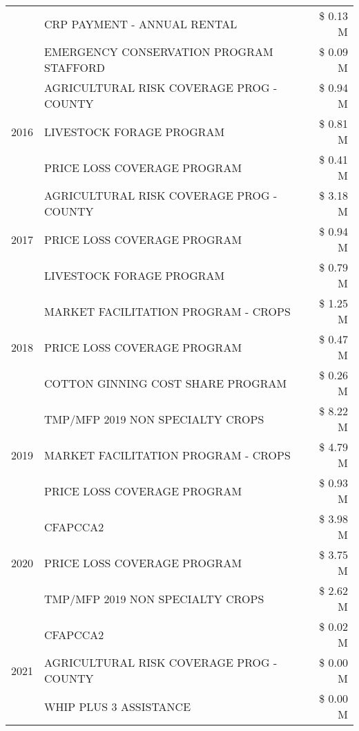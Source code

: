 \begin{tabular}{llr}
 & CRP PAYMENT - ANNUAL RENTAL & \$ 0.13 M \\
 & EMERGENCY CONSERVATION PROGRAM STAFFORD & \$ 0.09 M \\
\cline{1-3}
\multirow[t]{3}{*}{2016} & AGRICULTURAL RISK COVERAGE PROG - COUNTY      & \$ 0.94 M \\
 & LIVESTOCK FORAGE PROGRAM                      & \$ 0.81 M \\
 & PRICE LOSS COVERAGE PROGRAM                   & \$ 0.41 M \\
\cline{1-3}
\multirow[t]{3}{*}{2017} & AGRICULTURAL RISK COVERAGE PROG - COUNTY & \$ 3.18 M \\
 & PRICE LOSS COVERAGE PROGRAM & \$ 0.94 M \\
 & LIVESTOCK FORAGE PROGRAM & \$ 0.79 M \\
\cline{1-3}
\multirow[t]{3}{*}{2018} & MARKET FACILITATION PROGRAM - CROPS & \$ 1.25 M \\
 & PRICE LOSS COVERAGE PROGRAM & \$ 0.47 M \\
 & COTTON GINNING COST SHARE PROGRAM & \$ 0.26 M \\
\cline{1-3}
\multirow[t]{3}{*}{2019} & TMP/MFP 2019 NON SPECIALTY CROPS & \$ 8.22 M \\
 & MARKET FACILITATION PROGRAM - CROPS & \$ 4.79 M \\
 & PRICE LOSS COVERAGE PROGRAM & \$ 0.93 M \\
\cline{1-3}
\multirow[t]{3}{*}{2020} & CFAPCCA2 & \$ 3.98 M \\
 & PRICE LOSS COVERAGE PROGRAM & \$ 3.75 M \\
 & TMP/MFP 2019 NON SPECIALTY CROPS & \$ 2.62 M \\
\cline{1-3}
\multirow[t]{3}{*}{2021} & CFAPCCA2 & \$ 0.02 M \\
 & AGRICULTURAL RISK COVERAGE PROG - COUNTY & \$ 0.00 M \\
 & WHIP PLUS 3 ASSISTANCE & \$ 0.00 M \\
\cline{1-3}
\bottomrule
\end{tabular}
